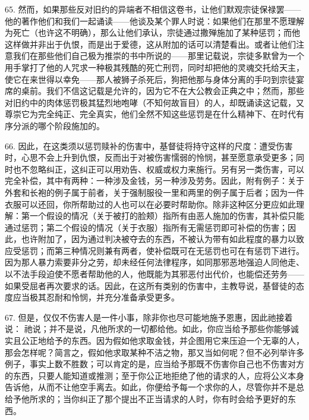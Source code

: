 65. 然而，如果那些反对旧约的异端者不相信这卷书，让他们默观宗徒保禄罢——他的著作他们和我们一起诵读——他谈及某个罪人时说：如果他们在那里不愿理解为死亡（也许这不明确），那么让他们承认，宗徒通过撒殚施加了某种惩罚；而他这样做并非出于仇恨，而是出于爱德，这从附加的话可以清楚看出。或者让他们注意我们在那些他们自己极为推崇的书中所说的——那里记载说，宗徒多默曾为一个用手掌打了他的人咒求一种极其残酷的死亡刑罚，同时却把他的灵魂交托给天主，使它在来世得以幸免——那人被狮子杀死后，狗把他那与身体分离的手叼到宗徒宴席的桌前。我们不信这记载是允许的，因为它不在大公教会正典之中；然而，那些对旧约中的肉体惩罚极其猛烈地咆哮（不知何故盲目）的人，却既诵读这记载，又尊崇它为完全纯正、完全真实，他们全然不知这些惩罚是在什么精神下、在时代有序分派的哪个阶段施加的。\par

66. 因此，在这类须以惩罚赎补的伤害中，基督徒将持守这样的尺度：遭受伤害时，心思不会上升到仇恨，反而出于对被伤害懦弱的怜悯，甚至愿意承受更多；同时也不忽略纠正，这纠正可以用劝告、权威或权力来施行。另有另一类伤害，可以完全补偿，其中有两种：一种涉及金钱，另一种涉及劳务。因此，附有例子：关于外套和长袍的例子属于前者，关于强制服役一里和两里的例子属于后者；因为一件衣服可以还回，你所帮助过的人也可以在必要时帮助你。除非这种区分更应如此理解：第一个假设的情况（关于被打的脸颊）指所有由恶人施加的伤害，其补偿只能通过惩罚；第二个假设的情况（关于衣服）指所有无需惩罚即可补偿的伤害；因此，也许附加了，因为通过判决被夺去的东西，不被认为带有如此程度的暴力以致应受惩罚；而第三种情况则兼有两者，使补偿既可在无惩罚也可在有惩罚下进行。因为那人暴力索要非分之劳，却未经任何法律程序，如同那邪恶地强迫人同他走、以不法手段迫使不愿者帮助他的人，他既能为其邪恶付出代价，也能偿还劳务——如果受屈者再次要求的话。因此，在这所有类别的伤害中，主教导说，基督徒的态度应当极其忍耐和怜悯，并充分准备承受更多。\par

67. 但是，仅仅不伤害人是一件小事，除非你也尽可能地施予恩惠，因此祂接着说： 祂说；并不是说，凡他所求的一切都给他。如此，你应当给予那些你能够诚实且公正地给予的东西。因为假如他求取金钱，并企图用它来压迫一个无辜的人，那会怎样呢？简言之，假如他求取某种不洁之物，那又当如何呢？但不必列举许多例子，事实上数不胜数；可以肯定的是，应当给予那既不伤害你自己也不伤害对方的东西，只要人能知道或推测；至于你公正地拒绝了他的请求的人，应将公义本身告诉他，从而不让他空手离去。如此，你便给予每一个求你的人，尽管你并不是总给予他所求的；当你纠正了那个提出不正当请求的人时，你有时会给予更好的东西。\par

